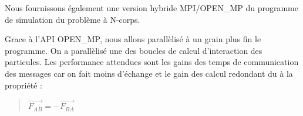 \par Nous fournissons également une version hybride MPI/OPEN\_MP 
du programme de simulation du problème à N-corps.
\par Grace à l'API OPEN\_MP, nous allons parallèlisé à un grain plus fin 
le programme. On a parallèlisé une des boucles de calcul d'interaction
des particules. Les performance attendues sont les gains des temps de communication
des messages  car on fait moins d'échange et le gain des calcul redondant du 
à la propriété :

\begin{quote}
  \begin{center}
    $ \overrightarrow{F_{AB}} = -\overrightarrow{F_{BA}} $
  \end{center}
\end{quote}
